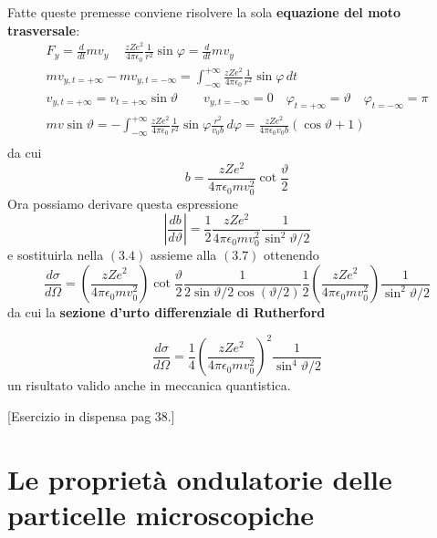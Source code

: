 Fatte queste premesse conviene risolvere la sola \textbf{equazione del moto trasversale}:
\begin{gather*}
	F_y = \frac{d}{dt}m v_y \quad \ \frac{zZe^2}{4 \pi \epsilon_0}\frac{1}{r^2}\sin \varphi = \frac{d}{dt}mv_y\\
	mv_{y,t= + \infty} - mv_{y,t = - \infty} = \int_{- \infty}^{+\infty} \frac{zZe^2}{4 \pi \epsilon_0}\frac{1}{r^2}\sin \varphi\,dt\\
	v_{y,t= + \infty} = v_{t= + \infty}\sin \vartheta \qquad v_{y,t = - \infty} = 0 \quad \varphi_{t = +\infty} = \vartheta \quad \varphi_{t = - \infty} = \pi\\
	mv \sin \vartheta = - \int_{- \infty}^{+ \infty} \frac{zZe^2}{4 \pi \epsilon_0}\frac{1}{r^2}\sin \varphi \frac{r^2}{v_0b}\,d \varphi = \frac{zZe^2}{4 \pi \epsilon_0 v_0 b}(\cos \vartheta + 1)\\
\end{gather*}
da cui
\begin{equation}
	b = \frac{zZe^2}{4 \pi \epsilon_0 m v^2_0} \cot \frac{\vartheta}{2}
\end{equation}
Ora possiamo derivare questa espressione
\[
	\left | \frac{db}{d \vartheta}\right | = \frac{1}{2}\frac{zZe^2}{4 \pi \epsilon_0 m v^2_0}\frac{1}{\sin^2{\vartheta/2}}
\]
e sostituirla nella $(3.4)$ assieme alla $(3.7)$ ottenendo
\[
	\frac{d \sigma }{d \Omega} = \left( \frac{zZe^2}{4 \pi \epsilon_0m v^2_0}\right) \cot{\frac{\vartheta}{2}}\frac{1}{2 \sin{\vartheta / 2 \cos (\vartheta /2)}}\frac{1}{2}\left( \frac{zZe^2}{4 \pi \epsilon_0m v^2_0}\right)\frac{1}{\sin^2{\vartheta/2}}
\]
da cui la \textbf{sezione d'urto differenziale di Rutherford}

\begin{equation}
	\frac{d \sigma }{d \Omega} = \frac{1}{4} \left( \frac{zZe^2}{4 \pi \epsilon_0m v^2_0}\right) ^2\frac{1}{\sin^4{\vartheta / 2}}
\end{equation} un risultato valido anche in meccanica quantistica.

	[Esercizio in dispensa pag 38.]

\section{Le proprietà ondulatorie delle particelle microscopiche}\label{sec:proprieta-ondulatorie-delle-particelle-microscopiche}

